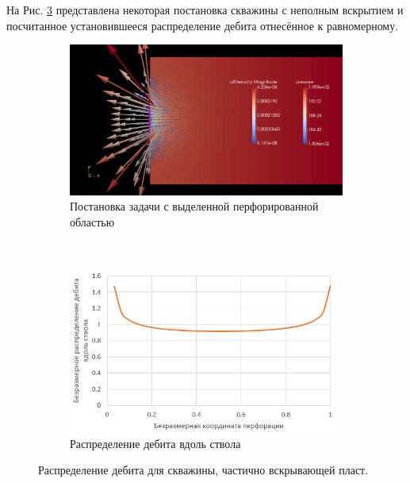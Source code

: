 	На Рис. \ref{pic:part_pen1} представлена некоторая постановка скважины с неполным вскрытием и посчитанное установившееся распределение дебита отнесённое к равномерному.
\begin{figure}[H]

	\begin{subfigure}[b]{0.5\textwidth}
	\centering
	\includegraphics[width=1\textwidth]{pic/part_penetrating1.png}
	\caption{Постановка задачи с выделенной перфорированной областью}
	\label{pic:part_problem1}
	\end{subfigure}
~
	\begin{subfigure}[b]{0.5\textwidth}
		\centering
		\includegraphics[width=1\textwidth]{pic/rate_distr1.png}
		\caption{Распределение дебита вдоль ствола}
		\label{pic:rate_distr1}
	\end{subfigure}
	\caption{Распределение дебита для скважины, частично вскрывающей пласт.}
	\label{pic:part_pen1}
\end{figure}
